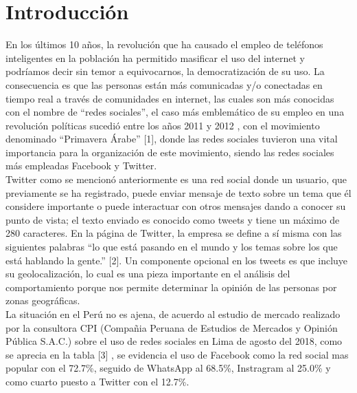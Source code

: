 \chapter{Introducci\'on}

En los últimos 10 años, la revolución que ha causado el empleo de teléfonos inteligentes en la población 
ha permitido masificar el uso del internet y podríamos decir sin temor a equivocarnos, la democratización de su uso.
 La consecuencia es que las personas están más comunicadas y/o conectadas en tiempo real a través  de comunidades 
 en internet, las cuales son más conocidas con el nombre de “redes sociales”, el caso más emblemático de su empleo 
 en una revolución políticas sucedió entre los años 2011 y 2012 , con el movimiento denominado  “Primavera Árabe” [1], 
 donde las redes sociales tuvieron una vital importancia para la organización de este movimiento, siendo las redes 
 sociales más empleadas Facebook y Twitter. \\
      
Twitter como se mencionó anteriormente es una red social donde un usuario, que previamente se ha registrado, 
puede enviar mensaje de texto sobre un tema que él considere importante o puede interactuar con otros mensajes 
dando a conocer su punto de vista; el texto enviado es conocido como tweets y tiene un máximo de 280 caracteres. 
En la página de Twitter, la empresa se define a sí misma con las siguientes palabras “lo que está pasando en el 
mundo y los temas sobre los que está hablando la gente.” [2]. Un componente opcional en los tweets es que incluye 
su geolocalización, lo cual es una pieza importante en el análisis del comportamiento porque nos permite determinar 
la opinión de las personas por zonas geográficas. \\

La situaci\'on en el Per\'u no es ajena, de acuerdo al estudio de mercado realizado por la consultora CPI (Compa\~nia Peruana de Estudios de Mercados y Opini\'on P\'ublica S.A.C.) sobre el uso de redes sociales en Lima de agosto del 2018, como se aprecia en la tabla [3] , se evidencia el uso de Facebook como la red social mas popular con el 72.7\%, seguido de WhatsApp al 68.5\%, Instragram al 25.0\% y como cuarto puesto a Twitter con el 12.7\%. \\


